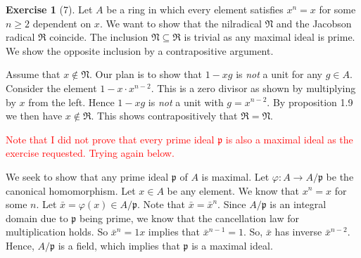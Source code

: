 \documentclass{article}
\theoremstyle{definition}
\newtheorem*{exercise}{Exercise}
\begin{document}
\begin{exercise}[7] Let $A$ be a ring in which every element satisfies
	$x^n = x$ for some $n \geq 2$ dependent on $x$. We want to show
	that the nilradical $\mathfrak{N}$ and the Jacobson radical
	$\mathfrak{R}$ coincide.  The inclusion $\mathfrak{N} \subseteq
	\mathfrak{R}$ is trivial as any maximal ideal is prime. We show
	the opposite inclusion by a contrapositive argument.

	Assume that $x \notin \mathfrak{N}$. Our plan is to show that $1 -
	xg$ is \emph{not} a unit for any $g \in A$. Consider the element
	$1 - x \cdot x^{n-2}$. This is a zero divisor as shown by
	multiplying by $x$ from the left. Hence $1 - xg$ is \emph{not} a
	unit with $g = x^{n-2}$. By proposition 1.9 we then have $x \notin
	\mathfrak{R}$. This shows contrapositively that $\mathfrak{R} =
	\mathfrak{N}$.

	\textcolor{red}{Note that I did not prove that every prime ideal
	$\mathfrak{p}$ is also a maximal ideal as the exercise requested.
Trying again below.}

	We seek to show that any prime ideal $\mathfrak{p}$ of $A$ is
	maximal. Let $\varphi : A \to A / \mathfrak{p}$ be the canonical
	homomorphism. Let $x \in A$ be any element. We know that $x^n = x$
	for some $n$. Let $\bar{x} = \varphi(x) \in A / \mathfrak{p}$.
	Note that $\bar{x} = \bar{x}^n$. Since $A / \mathfrak{p}$ is an
	integral domain due to $\mathfrak{p}$ being prime, we know that
	the cancellation law for multiplication holds. So $\bar{x}^n = 1
	x$ implies that $\bar{x}^{n-1} = 1$. So, $\bar{x}$ has
	inverse $\bar{x}^{n-2}$. Hence, $A / \mathfrak{p}$ is a field,
	which implies that $\mathfrak{p}$ is a maximal ideal.
\end{exercise}
\end{document}
